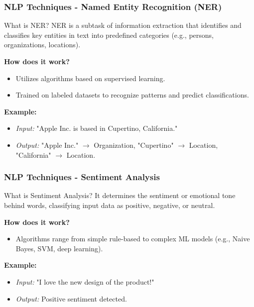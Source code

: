 \documentclass[aspectratio=169]{beamer}
\begin{document}
\begin{frame}[fragile]
    \frametitle{NLP Techniques - Named Entity Recognition (NER)}
    \begin{block}{What is NER?}
      NER is a subtask of information extraction that identifies and classifies key entities in text into predefined categories (e.g., persons, organizations, locations).
    \end{block}
    
    \textbf{How does it work?}
    \begin{itemize}
        \item Utilizes algorithms based on supervised learning.
        \item Trained on labeled datasets to recognize patterns and predict classifications.
    \end{itemize}
    
    \textbf{Example:}
    \begin{itemize}
        \item \textit{Input:} "Apple Inc. is based in Cupertino, California."
        \item \textit{Output:} "Apple Inc." $\rightarrow$ Organization, "Cupertino" $\rightarrow$ Location, "California" $\rightarrow$ Location.
    \end{itemize}

\end{frame}

\begin{frame}[fragile]
    \frametitle{NLP Techniques - Sentiment Analysis}
    \begin{block}{What is Sentiment Analysis?}
      It determines the sentiment or emotional tone behind words, classifying input data as positive, negative, or neutral.
    \end{block}

    \textbf{How does it work?}
    \begin{itemize}
        \item Algorithms range from simple rule-based to complex ML models (e.g., Naive Bayes, SVM, deep learning).
    \end{itemize}

    \textbf{Example:}
    \begin{itemize}
        \item \textit{Input:} "I love the new design of the product!"
        \item \textit{Output:} Positive sentiment detected.
    \end{itemize}

\end{frame}
\end{document}
